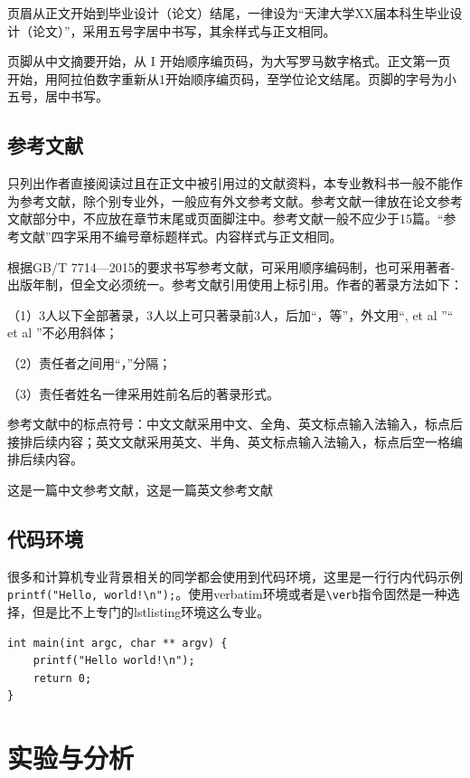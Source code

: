 页眉从正文开始到毕业设计（论文）结尾，一律设为“天津大学XX届本科生毕业设计（论文）”，采用五号字居中书写，其余样式与正文相同。

页脚从中文摘要开始，从 I 开始顺序编页码，为大写罗马数字格式。正文第一页开始，用阿拉伯数字重新从1开始顺序编页码，至学位论文结尾。页脚的字号为小五号，居中书写。

\section{参考文献}

只列出作者直接阅读过且在正文中被引用过的文献资料，本专业教科书一般不能作为参考文献，除个别专业外，一般应有外文参考文献。参考文献一律放在论文参考文献部分中，不应放在章节末尾或页面脚注中。参考文献一般不应少于15篇。“参考文献”四字采用不编号章标题样式。内容样式与正文相同。

根据GB/T 7714—2015的要求书写参考文献，可采用顺序编码制，也可采用著者-出版年制，但全文必须统一。参考文献引用使用上标引用。作者的著录方法如下：

（1）3人以下全部著录，3人以上可只著录前3人，后加“，等”，外文用“, et al ”“ et al ”不必用斜体；

（2）责任者之间用“，”分隔；

（3）责任者姓名一律采用姓前名后的著录形式。

参考文献中的标点符号：中文文献采用中文、全角、英文标点输入法输入，标点后接排后续内容；英文文献采用英文、半角、英文标点输入法输入，标点后空一格编排后续内容。

这是一篇中文参考文献\cite{RJXB202110009,zhou2016MLbook}，这是一篇英文参考文献\cite{kiymik2005FT}

\section{代码环境}

很多和计算机专业背景相关的同学都会使用到代码环境，这里是一行行内代码示例\verb|printf("Hello, world!\n");|。使用verbatim环境或者是\verb|\verb|指令固然是一种选择，但是比不上专门的lstlisting环境这么专业。

\begin{lstlisting}
int main(int argc, char ** argv) {
    printf("Hello world!\n");
    return 0;
}
\end{lstlisting}


\chapter{实验与分析}

